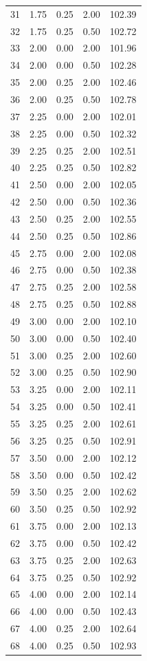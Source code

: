\begin{tabular}{rrrrr}
  31 & 1.75 & 0.25 & 2.00 & 102.39 \\ 
  32 & 1.75 & 0.25 & 0.50 & 102.72 \\ 
  33 & 2.00 & 0.00 & 2.00 & 101.96 \\ 
  34 & 2.00 & 0.00 & 0.50 & 102.28 \\ 
  35 & 2.00 & 0.25 & 2.00 & 102.46 \\ 
  36 & 2.00 & 0.25 & 0.50 & 102.78 \\ 
  37 & 2.25 & 0.00 & 2.00 & 102.01 \\ 
  38 & 2.25 & 0.00 & 0.50 & 102.32 \\ 
  39 & 2.25 & 0.25 & 2.00 & 102.51 \\ 
  40 & 2.25 & 0.25 & 0.50 & 102.82 \\ 
  41 & 2.50 & 0.00 & 2.00 & 102.05 \\ 
  42 & 2.50 & 0.00 & 0.50 & 102.36 \\ 
  43 & 2.50 & 0.25 & 2.00 & 102.55 \\ 
  44 & 2.50 & 0.25 & 0.50 & 102.86 \\ 
  45 & 2.75 & 0.00 & 2.00 & 102.08 \\ 
  46 & 2.75 & 0.00 & 0.50 & 102.38 \\ 
  47 & 2.75 & 0.25 & 2.00 & 102.58 \\ 
  48 & 2.75 & 0.25 & 0.50 & 102.88 \\ 
  49 & 3.00 & 0.00 & 2.00 & 102.10 \\ 
  50 & 3.00 & 0.00 & 0.50 & 102.40 \\ 
  51 & 3.00 & 0.25 & 2.00 & 102.60 \\ 
  52 & 3.00 & 0.25 & 0.50 & 102.90 \\ 
  53 & 3.25 & 0.00 & 2.00 & 102.11 \\ 
  54 & 3.25 & 0.00 & 0.50 & 102.41 \\ 
  55 & 3.25 & 0.25 & 2.00 & 102.61 \\ 
  56 & 3.25 & 0.25 & 0.50 & 102.91 \\ 
  57 & 3.50 & 0.00 & 2.00 & 102.12 \\ 
  58 & 3.50 & 0.00 & 0.50 & 102.42 \\ 
  59 & 3.50 & 0.25 & 2.00 & 102.62 \\ 
  60 & 3.50 & 0.25 & 0.50 & 102.92 \\ 
  61 & 3.75 & 0.00 & 2.00 & 102.13 \\ 
  62 & 3.75 & 0.00 & 0.50 & 102.42 \\ 
  63 & 3.75 & 0.25 & 2.00 & 102.63 \\ 
  64 & 3.75 & 0.25 & 0.50 & 102.92 \\ 
  65 & 4.00 & 0.00 & 2.00 & 102.14 \\ 
  66 & 4.00 & 0.00 & 0.50 & 102.43 \\ 
  67 & 4.00 & 0.25 & 2.00 & 102.64 \\ 
  68 & 4.00 & 0.25 & 0.50 & 102.93 \\ 
   \hline
\end{tabular}
